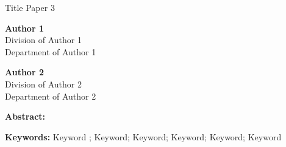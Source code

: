 
\begin{center}
	{Title Paper 3}\\
	
	\vspace{0.20cm}
	
	\textbf{Author 1}\\
	Division of Author 1\\
	Department of Author 1\\
	
	\vspace{0.12cm}
	
	\textbf{Author 2}\\
	Division of Author 2\\
	Department of Author 2\\
	
	\vspace{0.12cm}
\end{center}

\textbf{Abstract: }\lipsum[1]

\textbf{Keywords: } Keyword ; Keyword; Keyword; Keyword; Keyword; Keyword